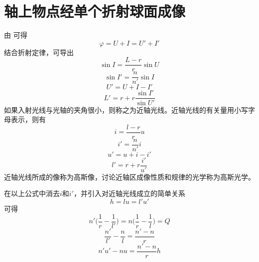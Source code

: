 \documentclass[cn,10pt,chinesefont=founder,math=newtx,cite=super,twoside]{elegantbook}
\begin{document}
\section{轴上物点经单个折射球面成像}
\label{sect:paraxial-ray}
由 可得
\begin{equation}
\varphi=U+I=U'+I'
\end{equation}
结合折射定律，可导出
\begin{equation}
\sin I=\frac{L-r}{r}\sin U
\end{equation}
\begin{equation}
\sin I'=\frac{n}{n'}\sin I
\end{equation}
\begin{equation}
U'=U+I-I'
\end{equation}
\begin{equation}
L'=r+r\frac{\sin I'}{\sin U'}
\end{equation}
如果入射光线与光轴的夹角很小，则称之为近轴光线。近轴光线的有关量用小写字母表示，则有
\begin{equation}
i=\frac{l-r}{r}u
\end{equation}
\begin{equation}
i'=\frac{n}{n'}i
\end{equation}
\begin{equation}
u'=u+i-i'
\end{equation}
\begin{equation}
l'=r+r\frac{i'}{u'}
\end{equation}
近轴光线所成的像称为高斯像，讨论近轴区成像性质和规律的光学称为高斯光学。

在以上公式中消去$i$和$i'$，并引入对近轴光线成立的简单关系
\begin{equation}
h=lu=l'u'
\end{equation}
可得
\begin{equation}
n'\bigg(\frac{1}{r}-\frac{1}{l'}\bigg)=n\bigg(\frac{1}{r}-\frac{1}{l}\bigg)=Q
\end{equation}
\begin{equation}
\frac{n'}{l'}-\frac{n}{l}=\frac{n'-n}{r}
\label{eq:spherical-refraction}
\end{equation}
\begin{equation}
n'u'-nu=\frac{n'-n}{r}h
\end{equation}
\end{document}
